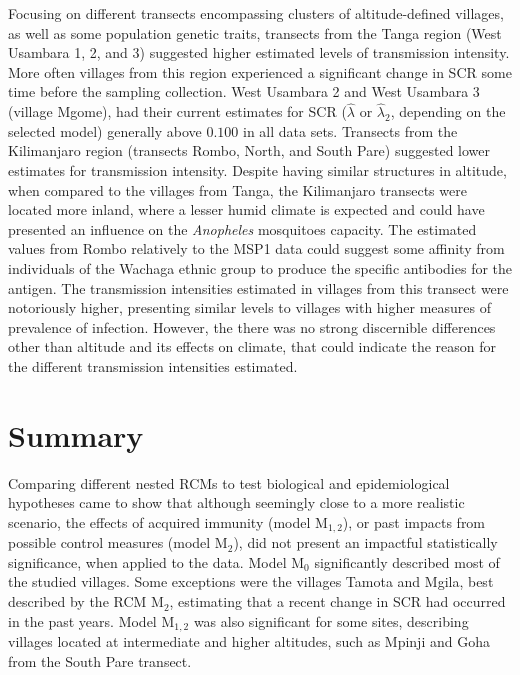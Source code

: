 Focusing on different transects encompassing clusters of altitude-defined villages, as well as some population genetic traits, transects from the Tanga region (West Usambara 1, 2, and 3) suggested higher estimated levels of transmission intensity.
More often villages from this region experienced a significant change in SCR some time before the sampling collection.
West Usambara 2 and West Usambara 3 (village Mgome), had their current estimates for SCR ($ \widehat{\lambda}$ or $ \widehat{\lambda}_2$, depending on the selected model) generally above $0.100$ in all data sets.
Transects from the Kilimanjaro region (transects Rombo, North, and South Pare) suggested lower estimates for transmission intensity.
Despite having similar structures in altitude, when compared to the villages from Tanga, the Kilimanjaro transects were located more inland, where a lesser humid climate is expected and could have presented an influence on the \textit{Anopheles} mosquitoes capacity.
The estimated values from Rombo relatively to the MSP1 data could suggest some affinity from individuals of the Wachaga ethnic group to produce the specific antibodies for the antigen.
The transmission intensities estimated in villages from this transect were notoriously higher, presenting similar levels to villages with higher measures of prevalence of infection.
However, the there was no strong discernible differences other than altitude and its effects on climate, that could indicate the reason for the different transmission intensities estimated.

\section{Summary}

Comparing different nested RCMs to test biological and epidemiological hypotheses came to show that although seemingly close to a more realistic scenario, the effects of acquired immunity (model M$_{1,2}$), or past impacts from possible control measures (model M$_2$), did not present an impactful statistically significance, when applied to the data.
Model M$_0$ significantly described most of the studied villages.
Some exceptions were the villages Tamota and Mgila, best described by the RCM M$_2$, estimating that a recent change in SCR had occurred in the past years.
Model M$_{1,2}$ was also significant for some sites, describing villages located at intermediate and higher altitudes, such as Mpinji and Goha from the South Pare transect.

